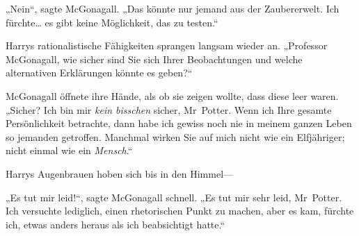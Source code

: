 „Nein“, sagte McGonagall. „Das könnte nur jemand aus der Zaubererwelt. Ich fürchte… es gibt keine Möglichkeit, das zu testen.“

Harrys rationalistische Fähigkeiten sprangen langsam wieder an. „Professor McGonagall, wie sicher sind Sie sich Ihrer Beobachtungen und welche alternativen Erklärungen könnte es geben?“

McGonagall öffnete ihre Hände, als ob sie zeigen wollte, dass diese leer waren. „Sicher? Ich bin mir \emph{kein bisschen} sicher, Mr~Potter. Wenn ich Ihre gesamte Persönlichkeit betrachte, dann habe ich gewiss noch nie in meinem ganzen Leben so jemanden getroffen. Manchmal wirken Sie auf mich nicht wie ein Elfjähriger; nicht einmal wie ein \emph{Mensch}.“

Harrys Augenbrauen hoben sich bis in den Himmel—

„Es tut mir leid!“, sagte McGonagall schnell. „Es tut mir sehr leid, Mr~Potter. Ich versuchte lediglich, einen rhetorischen Punkt zu machen, aber es kam, fürchte ich, etwas anders heraus als ich beabsichtigt hatte.“


